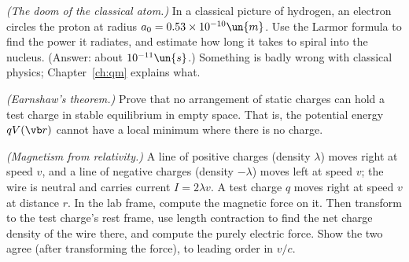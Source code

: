 \begin{problems}
\core \label{prob:classical-atom} \emph{(The doom of the classical atom.)} In a classical picture of hydrogen, an electron circles the proton at radius $a_0 = 0.53\times10^{-10}\un{m}$. Use the Larmor formula to find the power it radiates, and estimate how long it takes to spiral into the nucleus. (Answer: about $10^{-11}\un{s}$.) Something is badly wrong with classical physics; Chapter~\ref{ch:qm} explains what.

 \emph{(Earnshaw's theorem.)} Prove that no arrangement of static charges can hold a test charge in stable equilibrium in empty space. That is, the potential energy $qV(\vb r)$ cannot have a local minimum where there is no charge.

 \emph{(Magnetism from relativity.)} A line of positive charges (density $\lambda$) moves right at speed $v$, and a line of negative charges (density $-\lambda$) moves left at speed $v$; the wire is neutral and carries current $I = 2\lambda v$. A test charge $q$ moves right at speed $v$ at distance $r$. In the lab frame, compute the magnetic force on it. Then transform to the test charge's rest frame, use length contraction to find the net charge density of the wire there, and compute the purely electric force. Show the two agree (after transforming the force), to leading order in $v/c$.
\end{problems}

\begin{reading}
\end{reading}
